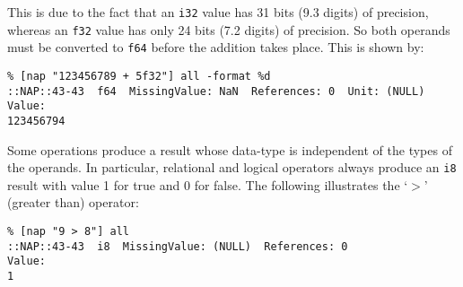 This is due to the fact that an 
  \texttt{i32} value has 31 bits (9.3 digits) of precision, whereas
  an 
  \texttt{f32} value has only 24 bits (7.2 digits) of precision. So
  both operands must be converted to 
  \texttt{f64} before the addition takes place. This is shown by:
  \begin{verbatim}
% [nap "123456789 + 5f32"] all -format %d
::NAP::43-43  f64  MissingValue: NaN  References: 0  Unit: (NULL)
Value:
123456794
\end{verbatim}

  

Some operations produce a result whose data-type is independent of
  the types of the operands. In particular, relational and logical
  operators always produce an 
  \texttt{i8} result with value 1 for true and 0 for false. The
  following illustrates the `\texttt{$>$}' (greater than) operator:
  \begin{verbatim}
% [nap "9 > 8"] all
::NAP::43-43  i8  MissingValue: (NULL)  References: 0
Value:
1
\end{verbatim}

